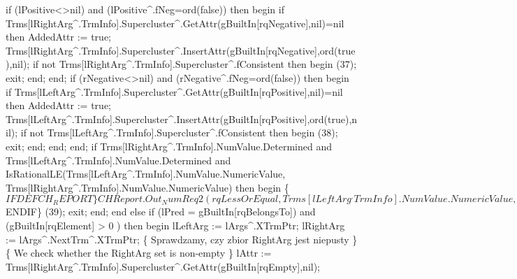                         if (lPositive<>nil) and (lPositive^.fNeg=ord(false)) then
                        begin
                           if Trms[lRightArg^.TrmInfo].Supercluster^.GetAttr(gBuiltIn[rqNegative],nil)=nil then AddedAttr := true;
                           Trms[lRightArg^.TrmInfo].Supercluster^.InsertAttr(gBuiltIn[rqNegative],ord(true),nil);
                           if not Trms[lRightArg^.TrmInfo].Supercluster^.fConsistent then
                           begin
                              (37);
                              exit;
                           end;
                        end;
                        if (rNegative<>nil) and (rNegative^.fNeg=ord(false)) then
                        begin
                           if Trms[lLeftArg^.TrmInfo].Supercluster^.GetAttr(gBuiltIn[rqPositive],nil)=nil
                           then AddedAttr := true;
                           Trms[lLeftArg^.TrmInfo].Supercluster^.InsertAttr(gBuiltIn[rqPositive],ord(true),nil);
                           if not Trms[lLeftArg^.TrmInfo].Supercluster^.fConsistent then
                           begin
                              (38);
                              exit;
                           end;
                        end;
                     end;
                     if Trms[lRightArg^.TrmInfo].NumValue.Determined and
                           Trms[lLeftArg^.TrmInfo].NumValue.Determined and
                           IsRationalLE(Trms[lLeftArg^.TrmInfo].NumValue.NumericValue,
                                        Trms[lRightArg^.TrmInfo].NumValue.NumericValue) then
                     begin
                        \{$IFDEF CH_REPORT\}
                        CHReport.Out_NumReq2(rqLessOrEqual,
                                             Trms[lLeftArg^.TrmInfo].NumValue.NumericValue,
                                             Trms[lRightArg^.TrmInfo].NumValue.NumericValue);
                        \{$ENDIF\}
                        (39);
                        exit;
                     end;
                  end
                  else if (lPred = gBuiltIn[rqBelongsTo]) and
                             (gBuiltIn[rqElement] > 0 ) then
                  begin lLeftArg := lArgs^.XTrmPtr;
                  lRightArg := lArgs^.NextTrm^.XTrmPtr;
                  \{ Sprawdzamy, czy zbior RightArg jest niepusty \}
                  \{ We check whether the RightArg set is non-empty \}
                  lAttr := Trms[lRightArg^.TrmInfo].Supercluster^.GetAttr(gBuiltIn[rqEmpty],nil);
